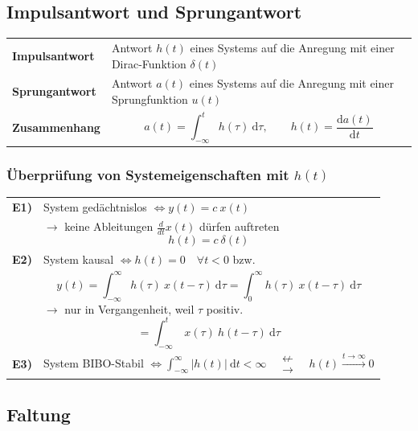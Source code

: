 \documentclass[10pt,a4paper]{article}
\begin{document}
\subsection*{Impulsantwort und Sprungantwort}
\begin{tabular}{l p{12cm}}
	\textbf{Impulsantwort} & Antwort $h(t)$ eines Systems auf die Anregung mit einer Dirac-Funktion $\delta(t)$ \\
	\textbf{Sprungantwort} & Antwort $a(t)$ eines Systems auf die Anregung mit einer Sprungfunktion $u(t)$ \\
	\textbf{Zusammenhang} & \vspace{-0.5cm}\[ a(t)=\int_{-\infty}^{t}h(\tau) ~ \mathrm d\tau, \qquad h(t) = \frac{\mathrm da(t)}{\mathrm dt} \]
\end{tabular}
\vspace{-0.6cm}
\subsubsection*{Überprüfung von Systemeigenschaften mit $h(t)$}
\begin{tabular}{l p{12cm}}
	\textbf{E1)} & System gedächtnislos $\Longleftrightarrow y(t) = c~x(t)$\\ & $\rightarrow$ keine Ableitungen $\frac{d}{dt}x(t)$ dürfen auftreten \[h(t)=c~\delta(t)\]\\
	\textbf{E2)} & System kausal $\Longleftrightarrow h(t)=0 \quad \forall t<0$ bzw.\\ & \[y(t)=\int_{-\infty}^{\infty}h(\tau) ~ x(t-\tau) ~ \mathrm d\tau = \int_{0}^{\infty} h(\tau) ~ x(t-\tau) ~ \mathrm d\tau\] $\rightarrow$ nur in Vergangenheit, weil $\tau$ positiv.
	\[=\int_{-\infty}^{t} ~ x(\tau) ~ h(t-\tau) ~ \mathrm d\tau\] \\
	\textbf{E3)} & System BIBO-Stabil $\Longleftrightarrow \int_{-\infty}^{\infty} |h(t)| ~ \mathrm dt < \infty \quad \substack{\nleftarrow\\[-1em] \rightarrow}\quad h(t)\overset{t\rightarrow\infty}{\longrightarrow}0$
\end{tabular}
\subsection*{Faltung}
\end{document}
